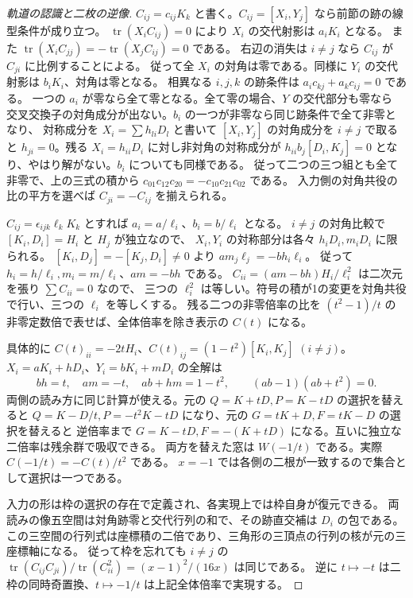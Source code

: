 \begin{proof}[軌道の認識と二枚の逆像]
$C_{ij}=c_{ij}K_k$ と書く。$C_{ij}=[X_i,Y_j]$ なら前節の跡の線型条件が成り立つ。
$\operatorname{tr}(X_i C_{ij})=0$ により $X_i$ の交代射影は $a_iK_i$ となる。
また $\operatorname{tr}(X_i C_{jj})=-\operatorname{tr}(X_j C_{ij})=0$ である。
右辺の消失は $i\ne j$ なら $C_{ij}$ が $C_{ji}$ に比例することによる。
従って全 $X_i$ の対角は零である。同様に $Y_i$ の交代射影は $b_iK_i$、対角は零となる。
相異なる $i,j,k$ の跡条件は $a_i c_{kj}+a_k c_{ij}=0$ である。
一つの $a_i$ が零なら全て零となる。全て零の場合、$Y$ の交代部分も零なら
交叉交換子の対角成分が出ない。$b_i$ の一つが非零なら同じ跡条件で全て非零となり、
対称成分を $X_i=\sum h_{li}D_l$ と書いて $[X_i,Y_j]$ の対角成分を $i\ne j$ で取ると
$h_{ji}=0$。残る $X_i=h_{ii}D_i$ に対し非対角の対称成分が
$h_{ii}b_j[D_i,K_j]=0$ となり、やはり解がない。$b_i$ についても同様である。
従って二つの三つ組とも全て非零で、上の三式の積から
$c_{01}c_{12}c_{20}=-c_{10}c_{21}c_{02}$ である。
入力側の対角共役の比の平方を選べば $C_{ji}=-C_{ij}$ を揃えられる。

$C_{ij}=\epsilon_{ijk}\ell_k K_k$ とすれば $a_i=a/\ell_i$、$b_i=b/\ell_i$ となる。
$i\ne j$ の対角比較で $[K_i,D_i]=H_i$ と $H_j$ が独立なので、
$X_i,Y_i$ の対称部分は各々 $h_iD_i,m_iD_i$ に限られる。
$[K_i,D_j]=-[K_j,D_i]\ne0$ より $a m_j\ell_j=-b h_i\ell_i$。
従って $h_i=h/\ell_i,m_i=m/\ell_i$、$am=-bh$ である。
$C_{ii}=(am-bh)H_i/\ell_i^2$ は二次元を張り $\sum C_{ii}=0$ なので、
三つの $\ell_i^2$ は等しい。符号の積が1の変更を対角共役で行い、三つの $\ell_i$ を等しくする。
残る二つの非零倍率の比を $(t^2-1)/t$ の非零定数倍で表せば、全体倍率を除き表示の $C(t)$ になる。

具体的に $C(t)_{ii}=-2t H_i$、$C(t)_{ij}=(1-t^2)[K_i,K_j]$ $(i\ne j)$。
$X_i=aK_i+hD_i$、$Y_i=bK_i+mD_i$ の全解は
\[
            bh=t,\quad am=-t,\quad ab+hm=1-t^2,\qquad (ab-1)(ab+t^2)=0 .
\]
両側の読み方に同じ計算が使える。元の $Q=K+tD,P=K-tD$ の選択を替えると
$Q=K-D/t,P=-t^2K-tD$ になり、元の $G=tK+D,F=tK-D$ の選択を替えると
逆倍率まで $G=K-tD,F=-(K+tD)$ になる。互いに独立な二倍率は残余群で吸収できる。
両方を替えた窓は $W(-1/t)$ である。実際 $C(-1/t)=-C(t)/t^2$ である。
$x=-1$ では各側の二根が一致するので集合として選択は一つである。

入力の形は枠の選択の存在で定義され、各実現上では枠自身が復元できる。
両読みの像五空間は対角跡零と交代行列の和で、その跡直交補は $D_i$ の包である。
この三空間の行列式は座標積の二倍であり、三角形の三頂点の行列の核が元の三座標軸になる。
従って枠を忘れても $i\ne j$ の
$\operatorname{tr}(C_{ij}C_{ji})/\operatorname{tr}(C_{ii}^2)=(x-1)^2/(16x)$ は同じである。
逆に $t\mapsto-t$ は二枠の同時奇置換、$t\mapsto-1/t$ は上記全体倍率で実現する。
\end{proof}

